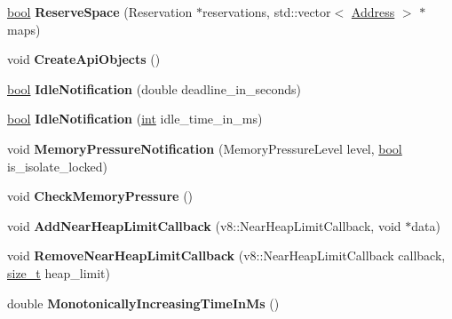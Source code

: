 \begin{DoxyCompactItemize}
\mbox{\hyperlink{classbool}{bool}} {\bfseries Reserve\+Space} (Reservation $\ast$reservations, std\+::vector$<$ \mbox{\hyperlink{classuintptr__t}{Address}} $>$ $\ast$maps)
\item 
\mbox{\label{classv8_1_1internal_1_1Heap_a163f0b10bc2294ed52a2d6bc3acdc332}} 
void {\bfseries Create\+Api\+Objects} ()
\item 
\mbox{\label{classv8_1_1internal_1_1Heap_a86bc3bf078afcba4fc8fce74b6a719de}} 
\mbox{\hyperlink{classbool}{bool}} {\bfseries Idle\+Notification} (double deadline\+\_\+in\+\_\+seconds)
\item 
\mbox{\label{classv8_1_1internal_1_1Heap_ab09bb96bf651ff735bee6cad4ac9231b}} 
\mbox{\hyperlink{classbool}{bool}} {\bfseries Idle\+Notification} (\mbox{\hyperlink{classint}{int}} idle\+\_\+time\+\_\+in\+\_\+ms)
\item 
\mbox{\label{classv8_1_1internal_1_1Heap_afa44363b61a017c76f26d6761d20e8a5}} 
void {\bfseries Memory\+Pressure\+Notification} (Memory\+Pressure\+Level level, \mbox{\hyperlink{classbool}{bool}} is\+\_\+isolate\+\_\+locked)
\item 
\mbox{\label{classv8_1_1internal_1_1Heap_a53b67fd5f8cba84b479037cd33ac9b9a}} 
void {\bfseries Check\+Memory\+Pressure} ()
\item 
\mbox{\label{classv8_1_1internal_1_1Heap_ab96adb88161b5e1cc89000b46bd15ad7}} 
void {\bfseries Add\+Near\+Heap\+Limit\+Callback} (v8\+::\+Near\+Heap\+Limit\+Callback, void $\ast$data)
\item 
\mbox{\label{classv8_1_1internal_1_1Heap_abe8c02b3d27bfba2929b5b993eec07b2}} 
void {\bfseries Remove\+Near\+Heap\+Limit\+Callback} (v8\+::\+Near\+Heap\+Limit\+Callback callback, \mbox{\hyperlink{classsize__t}{size\+\_\+t}} heap\+\_\+limit)
\item 
\mbox{\label{classv8_1_1internal_1_1Heap_aba15a8e74ad01511849eccc4d458e97a}} 
double {\bfseries Monotonically\+Increasing\+Time\+In\+Ms} ()
\item 

\end{DoxyCompactItemize}
